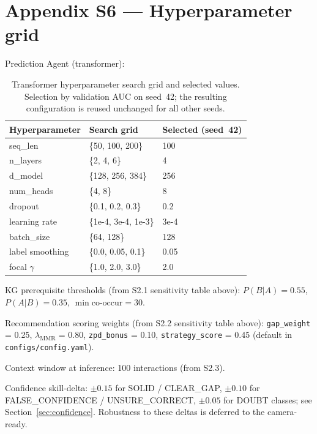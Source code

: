 \section*{Appendix S6 — Hyperparameter grid}
\label{appendix:s6}

Prediction Agent (transformer):
\begin{table}[h]
\centering
\small
\begin{tabular}{lll}
\toprule
Hyperparameter & Search grid & Selected (seed~42)\\
\midrule
seq\_len        & \{50, 100, 200\}            & 100\\
n\_layers       & \{2, 4, 6\}                 & 4\\
d\_model        & \{128, 256, 384\}           & 256\\
num\_heads      & \{4, 8\}                    & 8\\
dropout         & \{0.1, 0.2, 0.3\}           & 0.2\\
learning rate   & \{1e-4, 3e-4, 1e-3\}        & 3e-4\\
batch\_size     & \{64, 128\}                 & 128\\
label smoothing & \{0.0, 0.05, 0.1\}          & 0.05\\
focal $\gamma$  & \{1.0, 2.0, 3.0\}           & 2.0\\
\bottomrule
\end{tabular}
\caption{Transformer hyperparameter search grid and selected values. Selection by validation AUC on seed~42; the resulting configuration is reused unchanged for all other seeds.}
\label{tab:hyperparams_transformer}
\end{table}

KG prerequisite thresholds (from S2.1 sensitivity table above):
$P(B|A) = 0.55$, $P(A|B) = 0.35$, $\min\text{co-occur} = 30$.

Recommendation scoring weights (from S2.2 sensitivity table above):
\texttt{gap\_weight} = 0.25, $\lambda_{\text{MMR}}$ = 0.80, \texttt{zpd\_bonus} = 0.10, \texttt{strategy\_score} = 0.45 (default in \texttt{configs/config.yaml}).

Context window at inference: 100 interactions (from S2.3).

Confidence skill-delta: $\pm 0.15$ for SOLID / CLEAR\_GAP, $\pm 0.10$ for FALSE\_CONFIDENCE / UNSURE\_CORRECT, $\pm 0.05$ for DOUBT classes; see Section~\ref{sec:confidence}. Robustness to these deltas is deferred to the camera-ready.
